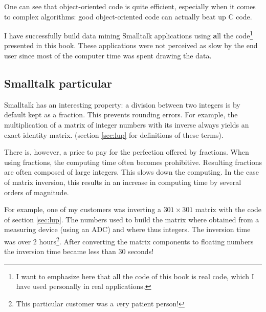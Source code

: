 One can see that object-oriented code is quite efficient,
especially when it comes to complex algorithms: good
object-oriented code can actually beat up C code.


I have successfully build data mining Smalltalk
applications using {\textbf all the code}\footnote{I want to emphasize
here that all the code of this book is real code, which I have
used personally in real applications.} presented in this book.
These applications were not perceived as slow by the end user
since most of the computer time was spent drawing the data.

\subsection{Smalltalk particular}
Smalltalk has an interesting property: a division between two
integers is by default kept as a fraction. This prevents rounding
errors. For example, the multiplication of a matrix of integer
numbers with its inverse always yields an exact identity matrix.
(\cf section \ref{sec:lup} for definitions of these terms).

There is, however, a price to pay for the perfection offered by
fractions. When using fractions, the computing time often becomes
prohibitive. Resulting fractions are often composed of large
integers. This slows down the computing. In the case of matrix
inversion, this results in an increase in computing time by
several orders of magnitude.

For example, one of my customers was inverting a $301\times 301$
matrix with the code of section \ref{sec:lup}. The numbers used to
build the matrix where obtained from a measuring device (using an
ADC) and where thus integers. The inversion time was over 2
hours\footnote{This particular customer was a {\textsl very} patient
person!}. After converting the matrix components to floating
numbers the inversion time became less than 30 seconds!


